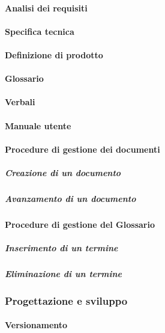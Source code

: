 			\paragraph{Analisi dei requisiti}

			\paragraph{Specifica tecnica}

			\paragraph{Definizione di prodotto}

			\paragraph{Glossario}

			\paragraph{Verbali}

			\paragraph{Manuale utente}

			\paragraph{Procedure di gestione dei documenti}
				
				\subparagraph{Creazione di un documento}
				
				\subparagraph{Avanzamento di un documento}

			\paragraph{Procedure di gestione del Glossario}
				
				\subparagraph{Inserimento di un termine}
				
				\subparagraph{Eliminazione di un termine}

		\subsubsection{Progettazione e sviluppo}

			\paragraph{Versionamento}

